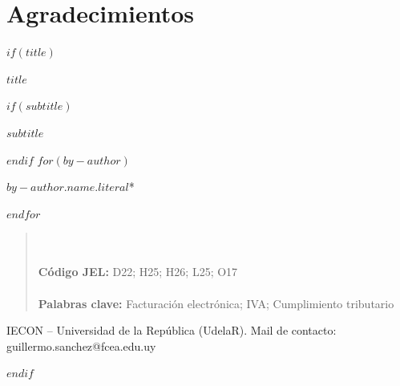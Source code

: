 \section*{Agradecimientos}
\thispagestyle{empty}

$if(title)$
\cleardoublepage
\thispagestyle{empty}
{\centering
{\huge\bfseries $title$ \par}
$if(subtitle)$
\vspace{1ex}
{\Large\bfseries $subtitle$ \par}
$endif$
\vspace{3ex}
$for(by-author)$
{\large $by-author.name.literal$*\par}
$endfor$
\vspace{3ex}
}
{\begin{quote}
{\footnotesize
\onehalfspacing

\vspace{1ex}
\\~\\
\textbf{Código JEL:} D22; H25; H26; L25; O17 \\~\\
\textbf{Palabras clave:} Facturación electrónica; IVA; Cumplimiento tributario
}
\end{quote}\par}
{\vfill}
{\footnotesize * IECON -- Universidad de la República (UdelaR). 
Mail de contacto: guillermo.sanchez@fcea.edu.uy\par}
{\small\par}
$endif$
